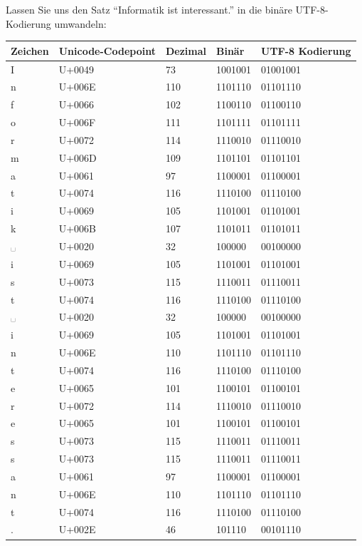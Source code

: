 \documentclass[
  nswissgerman,
  a4paper,
  DIV=11,
  numbers=noendperiod,
  ngerman]{scrreprt}
\newcounter{none} %
\begin{document}
Lassen Sie uns den Satz ``Informatik ist interessant.'' in die binäre
UTF-8-Kodierung umwandeln:

{\def\LTcaptype{none} %
\begin{longtable}[]{@{}lllll@{}}
\toprule\noalign{}
Zeichen & Unicode-Codepoint & Dezimal & Binär & UTF-8 Kodierung \\
\midrule\noalign{}
\endhead
\bottomrule\noalign{}
\endlastfoot
I & U+0049 & 73 & 1001001 & 01001001 \\
n & U+006E & 110 & 1101110 & 01101110 \\
f & U+0066 & 102 & 1100110 & 01100110 \\
o & U+006F & 111 & 1101111 & 01101111 \\
r & U+0072 & 114 & 1110010 & 01110010 \\
m & U+006D & 109 & 1101101 & 01101101 \\
a & U+0061 & 97 & 1100001 & 01100001 \\
t & U+0074 & 116 & 1110100 & 01110100 \\
i & U+0069 & 105 & 1101001 & 01101001 \\
k & U+006B & 107 & 1101011 & 01101011 \\
␣ & U+0020 & 32 & 100000 & 00100000 \\
i & U+0069 & 105 & 1101001 & 01101001 \\
s & U+0073 & 115 & 1110011 & 01110011 \\
t & U+0074 & 116 & 1110100 & 01110100 \\
␣ & U+0020 & 32 & 100000 & 00100000 \\
i & U+0069 & 105 & 1101001 & 01101001 \\
n & U+006E & 110 & 1101110 & 01101110 \\
t & U+0074 & 116 & 1110100 & 01110100 \\
e & U+0065 & 101 & 1100101 & 01100101 \\
r & U+0072 & 114 & 1110010 & 01110010 \\
e & U+0065 & 101 & 1100101 & 01100101 \\
s & U+0073 & 115 & 1110011 & 01110011 \\
s & U+0073 & 115 & 1110011 & 01110011 \\
a & U+0061 & 97 & 1100001 & 01100001 \\
n & U+006E & 110 & 1101110 & 01101110 \\
t & U+0074 & 116 & 1110100 & 01110100 \\
. & U+002E & 46 & 101110 & 00101110 \\
\end{longtable}
}
\end{document}
